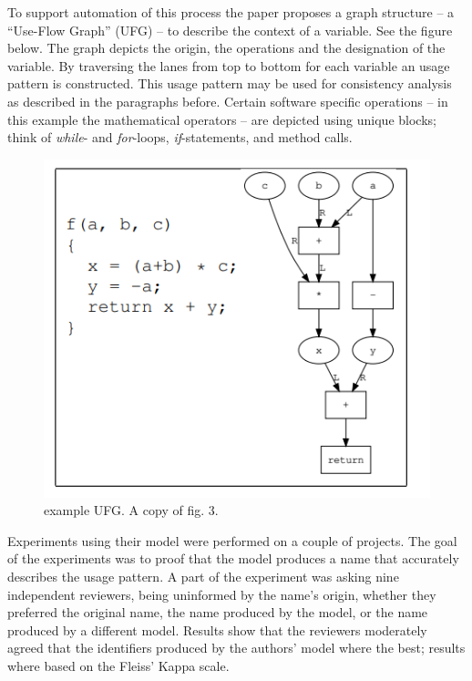 \documentclass[a4paper,12pt]{article}
\begin{document}
\begin{multicols}{2}
To support automation of this process the paper proposes a graph structure -- a “Use-Flow Graph” (UFG) -- to describe the context of a variable. See the figure below. The graph depicts the origin, the operations and the designation of the variable. By traversing the lanes from top to bottom for each variable an usage pattern is constructed. This usage pattern  may be used for consistency analysis as described in the paragraphs before. Certain software specific operations -- in this example the mathematical operators -- are depicted using unique blocks; think of \textit{while}- and \textit{for}-loops, \textit{if}-statements, and method calls. 

\begin{figure}[H]
    \centering
    \includegraphics[width=1.0\linewidth]{ufg}
    \caption{example UFG. A copy of fig. 3.\cite{shinyama_improving_2021}}
    \label{fig:ufg}
\end{figure}
\hfill

Experiments using their model were performed on a couple of projects. The goal of the experiments was to proof that the model produces a name that accurately describes the usage pattern. A part of the experiment was asking nine independent reviewers, being uninformed by the name's origin, whether they preferred the original name, the name produced by the model, or the name produced by a different model. Results show that the reviewers moderately agreed that the identifiers produced by the authors' model where the best; results where based on the Fleiss' Kappa scale.
    

\end{multicols}
\end{document}

